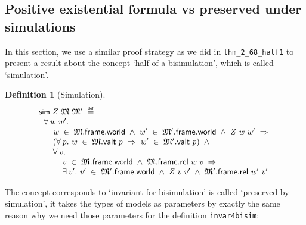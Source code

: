 \documentclass[letterpaper]{article}
\newtheorem{defn}{Definition}
\renewcommand{\HOLConst}[1]{{\textsf{\upshape\small #1}}}
\newenvironment{holmath}{\begin{displaymath}\begin{array}{l}}{\end{array}\end{displaymath}\ignorespacesafterend}
\begin{document}
\subsection{Positive existential formula vs preserved under simulations}
In this section, we use a similar proof strategy as we did in \texttt{thm_2_68_half1} to present a result about the concept `half of a bisimulation', which is called `simulation'.

\begin{defn}[Simulation]
\begin{holmath}
  \HOLConst{sim}\;\HOLFreeVar{Z}\;\HOLFreeVar{\ensuremath{\mathfrak{M}}}\;\HOLFreeVar{\ensuremath{\mathfrak{M}'}}\;\HOLSymConst{\HOLTokenDefEquality{}}\\
\;\;\HOLSymConst{\HOLTokenForall{}}\HOLBoundVar{w}\;\HOLBoundVar{w\sp{\prime}}.\\
\;\;\;\;\;\;\HOLBoundVar{w}\;\HOLSymConst{\HOLTokenIn{}}\;\HOLFreeVar{\ensuremath{\mathfrak{M}}}.\HOLFieldName{frame}.\HOLFieldName{world}\;\HOLSymConst{\HOLTokenConj{}}\;\HOLBoundVar{w\sp{\prime}}\;\HOLSymConst{\HOLTokenIn{}}\;\HOLFreeVar{\ensuremath{\mathfrak{M}'}}.\HOLFieldName{frame}.\HOLFieldName{world}\;\HOLSymConst{\HOLTokenConj{}}\;\HOLFreeVar{Z}\;\HOLBoundVar{w}\;\HOLBoundVar{w\sp{\prime}}\;\HOLSymConst{\HOLTokenImp{}}\\
\;\;\;\;\;\;(\HOLSymConst{\HOLTokenForall{}}\HOLBoundVar{p}.\;\HOLBoundVar{w}\;\HOLSymConst{\HOLTokenIn{}}\;\HOLFreeVar{\ensuremath{\mathfrak{M}}}.\HOLFieldName{valt}\;\HOLBoundVar{p}\;\HOLSymConst{\HOLTokenImp{}}\;\HOLBoundVar{w\sp{\prime}}\;\HOLSymConst{\HOLTokenIn{}}\;\HOLFreeVar{\ensuremath{\mathfrak{M}'}}.\HOLFieldName{valt}\;\HOLBoundVar{p})\;\HOLSymConst{\HOLTokenConj{}}\\
\;\;\;\;\;\;\HOLSymConst{\HOLTokenForall{}}\HOLBoundVar{v}.\\
\;\;\;\;\;\;\;\;\;\;\HOLBoundVar{v}\;\HOLSymConst{\HOLTokenIn{}}\;\HOLFreeVar{\ensuremath{\mathfrak{M}}}.\HOLFieldName{frame}.\HOLFieldName{world}\;\HOLSymConst{\HOLTokenConj{}}\;\HOLFreeVar{\ensuremath{\mathfrak{M}}}.\HOLFieldName{frame}.\HOLFieldName{rel}\;\HOLBoundVar{w}\;\HOLBoundVar{v}\;\HOLSymConst{\HOLTokenImp{}}\\
\;\;\;\;\;\;\;\;\;\;\HOLSymConst{\HOLTokenExists{}}\HOLBoundVar{v\sp{\prime}}.\;\HOLBoundVar{v\sp{\prime}}\;\HOLSymConst{\HOLTokenIn{}}\;\HOLFreeVar{\ensuremath{\mathfrak{M}'}}.\HOLFieldName{frame}.\HOLFieldName{world}\;\HOLSymConst{\HOLTokenConj{}}\;\HOLFreeVar{Z}\;\HOLBoundVar{v}\;\HOLBoundVar{v\sp{\prime}}\;\HOLSymConst{\HOLTokenConj{}}\;\HOLFreeVar{\ensuremath{\mathfrak{M}'}}.\HOLFieldName{frame}.\HOLFieldName{rel}\;\HOLBoundVar{w\sp{\prime}}\;\HOLBoundVar{v\sp{\prime}}
\end{holmath}
\end{defn}
The concept corresponds to `invariant for bisimulation' is called `preserved by simulation', it takes the types of models as parameters by exactly the same reason why we need those parameters for the definition \texttt{invar4bisim}:
\end{document}
